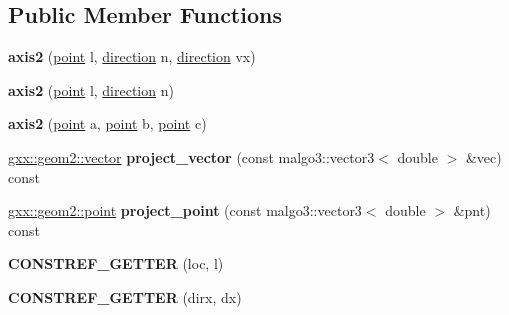 \subsection*{Public Member Functions}
\begin{DoxyCompactItemize}
\item 
{\bfseries axis2} (\hyperlink{classgxx_1_1geom3_1_1point}{point} l, \hyperlink{classgxx_1_1geom3_1_1direction}{direction} n, \hyperlink{classgxx_1_1geom3_1_1direction}{direction} vx)\hypertarget{classgxx_1_1geom3_1_1axis2_a807a7398df31fbcba7fec71b2c89d8c8}{}\label{classgxx_1_1geom3_1_1axis2_a807a7398df31fbcba7fec71b2c89d8c8}

\item 
{\bfseries axis2} (\hyperlink{classgxx_1_1geom3_1_1point}{point} l, \hyperlink{classgxx_1_1geom3_1_1direction}{direction} n)\hypertarget{classgxx_1_1geom3_1_1axis2_a6e3462034e771e2719acc408e6df9ec0}{}\label{classgxx_1_1geom3_1_1axis2_a6e3462034e771e2719acc408e6df9ec0}

\item 
{\bfseries axis2} (\hyperlink{classgxx_1_1geom3_1_1point}{point} a, \hyperlink{classgxx_1_1geom3_1_1point}{point} b, \hyperlink{classgxx_1_1geom3_1_1point}{point} c)\hypertarget{classgxx_1_1geom3_1_1axis2_a3ee7933a05115475fd63bd4c829cbc81}{}\label{classgxx_1_1geom3_1_1axis2_a3ee7933a05115475fd63bd4c829cbc81}

\item 
\hyperlink{classmalgo_1_1vector2}{gxx\+::geom2\+::vector} {\bfseries project\+\_\+vector} (const malgo3\+::vector3$<$ double $>$ \&vec) const \hypertarget{classgxx_1_1geom3_1_1axis2_a7d2f121065e1677e603b2eb0da53124b}{}\label{classgxx_1_1geom3_1_1axis2_a7d2f121065e1677e603b2eb0da53124b}

\item 
\hyperlink{classmalgo_1_1vector2}{gxx\+::geom2\+::point} {\bfseries project\+\_\+point} (const malgo3\+::vector3$<$ double $>$ \&pnt) const \hypertarget{classgxx_1_1geom3_1_1axis2_a33e08456b3b043500219a016df956db7}{}\label{classgxx_1_1geom3_1_1axis2_a33e08456b3b043500219a016df956db7}

\item 
{\bfseries C\+O\+N\+S\+T\+R\+E\+F\+\_\+\+G\+E\+T\+T\+ER} (loc, l)\hypertarget{classgxx_1_1geom3_1_1axis2_ab06da104334da34a74703e3e1e4ac91d}{}\label{classgxx_1_1geom3_1_1axis2_ab06da104334da34a74703e3e1e4ac91d}

\item 
{\bfseries C\+O\+N\+S\+T\+R\+E\+F\+\_\+\+G\+E\+T\+T\+ER} (dirx, dx)\hypertarget{classgxx_1_1geom3_1_1axis2_ae6dda12eb6d1e7bb6443c688dad430f9}{}\label{classgxx_1_1geom3_1_1axis2_ae6dda12eb6d1e7bb6443c688dad430f9}


\end{DoxyCompactItemize}
